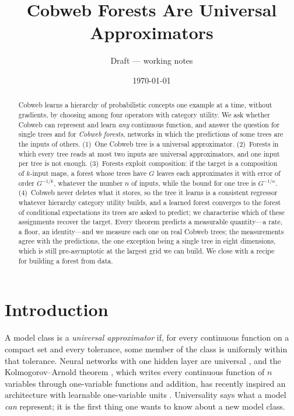 \title{Cobweb Forests Are Universal Approximators}
\author{Draft --- working notes}
\date{\today}


\maketitle

\begin{abstract}
Cobweb learns a hierarchy of probabilistic concepts one example at a time, without
gradients, by choosing among four operators with category utility.  We ask whether
Cobweb can represent and learn \emph{any} continuous function, and answer the question
for single trees and for \emph{Cobweb forests}, networks in which the predictions of some
trees are the inputs of others.  (1)~One Cobweb tree is a universal approximator.
(2)~Forests in which every tree reads at most two inputs are universal approximators, and
one input per tree is not enough.  (3)~Forests exploit composition: if the target is a
composition of $k$-input maps, a forest whose trees have $G$ leaves each approximates it
with error of order $G^{-1/k}$, whatever the number $n$ of inputs, while the bound for one
tree is $G^{-1/n}$.  (4)~Cobweb never deletes what it stores, so the tree it learns is a
consistent regressor whatever hierarchy category utility builds, and a learned forest
converges to the forest of conditional expectations its trees are asked to predict; we
characterise which of these assignments recover the target.  Every theorem predicts a
measurable quantity---a rate, a floor, an identity---and we measure each one on real
Cobweb trees; the measurements agree with the predictions, the one exception being a
single tree in eight dimensions, which is still pre-asymptotic at the largest grid we can
build.  We close with a recipe for
building a forest from data.
\end{abstract}

\tableofcontents

\section{Introduction}\label{sec:intro}

A model class is a \emph{universal approximator} if, for every continuous function on a
compact set and every tolerance, some member of the class is uniformly within that
tolerance.  Neural networks with one hidden layer are universal \citep{cybenko1989,hornik1989},
and the Kolmogorov--Arnold theorem \citep{kolmogorov1957,arnold1957}, which writes every
continuous function of $n$ variables through one-variable functions and addition, has
recently inspired an architecture with learnable one-variable units
\citep{liu2024kan}.  Universality says what a model \emph{can} represent; it is the first
thing one wants to know about a new model class.

